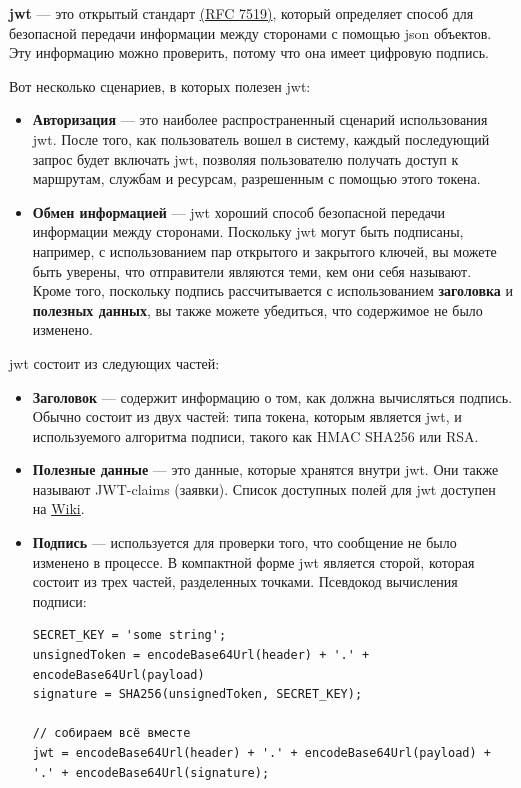 \textbf{\acrfull{jwt}} --- это открытый стандарт \href{https://tools.ietf.org/html/rfc7519}{(RFC 7519)}, который определяет способ для безопасной передачи информации между сторонами с помощью \acrshort{json} объектов. Эту информацию можно проверить, потому что она имеет цифровую подпись.

Вот несколько сценариев, в которых полезен \acrshort{jwt}:
\begin{itemize}
    \item \textbf{Авторизация} --- это наиболее распространенный сценарий использования \acrshort{jwt}. После того, как пользователь вошел в систему, каждый последующий запрос будет включать \acrshort{jwt}, позволяя пользователю получать доступ к маршрутам, службам и ресурсам, разрешенным с помощью этого токена.
    \item \textbf{Обмен информацией} --- \acrshort{jwt} хороший способ безопасной передачи информации между сторонами. Поскольку \acrshort{jwt} могут быть подписаны, например, с использованием пар открытого и закрытого ключей, вы можете быть уверены, что отправители являются теми, кем они себя называют. Кроме того, поскольку подпись рассчитывается с использованием \textbf{заголовка} и \textbf{полезных данных}, вы также можете убедиться, что содержимое не было изменено.
\end{itemize}

\acrshort{jwt} состоит из следующих частей:
\begin{itemize}
    \item \textbf{Заголовок} --- содержит информацию о том, как должна вычисляться подпись. Обычно состоит из двух частей: типа токена, которым является \acrshort{jwt}, и используемого алгоритма подписи, такого как HMAC SHA256 или RSA.
    \item \textbf{Полезные данные} --- это данные, которые хранятся внутри \acrshort{jwt}. Они также называют JWT-claims (заявки). Список доступных полей для \acrshort{jwt} доступен на \href{https://en.wikipedia.org/wiki/JSON_Web_Token#Standard_fields}{Wiki}.
    \item \textbf{Подпись} --- используется для проверки того, что сообщение не было изменено в процессе. В компактной форме \acrshort{jwt} является сторой, которая состоит из трех частей, разделенных точками. Псевдокод вычисления подписи:
    \begin{noerr}
    \begin{verbatim}
SECRET_KEY = 'some string';
unsignedToken = encodeBase64Url(header) + '.' + encodeBase64Url(payload)
signature = SHA256(unsignedToken, SECRET_KEY);

// собираем всё вместе
jwt = encodeBase64Url(header) + '.' + encodeBase64Url(payload) + '.' + encodeBase64Url(signature);
    \end{verbatim}
    \end{noerr}
\end{itemize}

